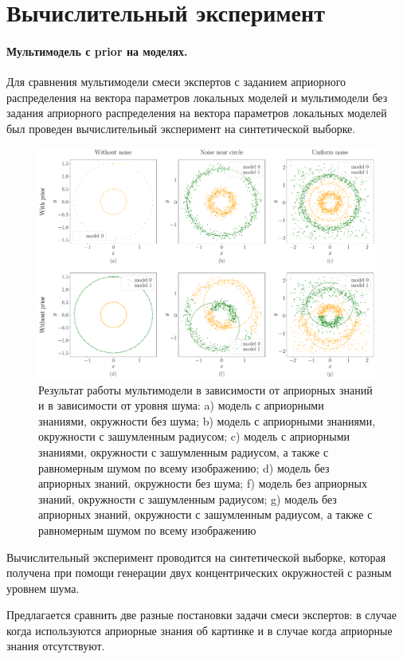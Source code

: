\documentclass[12pt, twoside]{article}
\numberwithin{equation}{section}
\begin{document}
\section{Вычислительный эксперимент}
\paragraph{Мультимодель с prior на моделях.}
Для сравнения мультимодели смеси экспертов с заданием априорного распределения на вектора параметров локальных моделей и мультимодели без задания априорного распределения на вектора параметров локальных моделей был проведен вычислительный эксперимент на синтетической выборке.

\begin{figure}[h!t]\center
\includegraphics[width=1\textwidth]{result/experiment_synthetic}
\caption{Результат работы мультимодели в зависимости от априорных знаний и в зависимости от уровня шума: a) модель с априорными знаниями, окружности без шума; b) модель с априорными знаниями, окружности с зашумленным радиусом; c) модель с априорными знаниями, окружности с зашумленным радиусом, а также с равномерным шумом по всему изображению; d) модель без априорных знаний, окружности без шума; f) модель без априорных знаний, окружности с зашумленным радиусом; g) модель без априорных знаний, окружности с зашумленным радиусом, а также с равномерным шумом по всему изображению}
\label{experiment:1}
\end{figure}
Вычислительный эксперимент проводится на синтетической выборке, которая получена при помощи генерации двух концентрических окружностей с разным уровнем шума.

Предлагается сравнить две разные постановки задачи смеси экспертов: в случае когда используются априорные знания об картинке и в случае когда априорные знания отсутствуют.
\end{document}
